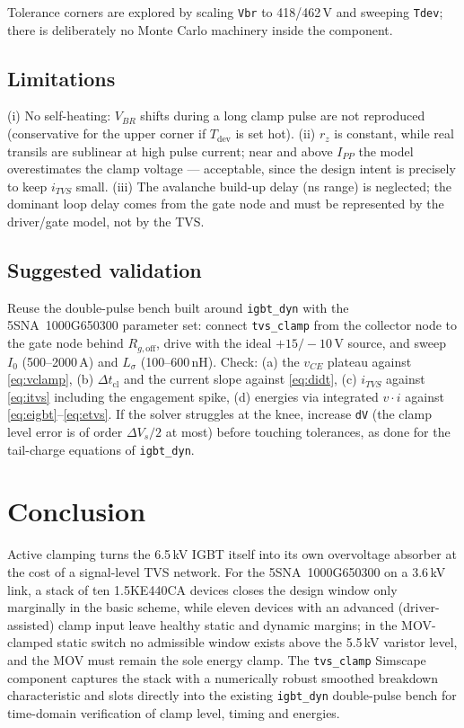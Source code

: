 \documentclass[11pt,a4paper]{article}
\begin{document}
Tolerance corners are explored by scaling \texttt{Vbr} to
418/462\,V and sweeping \texttt{Tdev}; there is deliberately no Monte
Carlo machinery inside the component.

\subsection{Limitations}

(i) No self-heating: $V_{BR}$ shifts during a long clamp pulse are not
reproduced (conservative for the upper corner if $T_{\mathrm{dev}}$ is
set hot). (ii) $r_z$ is constant, while real transils are sublinear at
high pulse current; near and above $I_{PP}$ the model overestimates the
clamp voltage --- acceptable, since the design intent is precisely to
keep $i_{TVS}$ small. (iii) The avalanche build-up delay (ns range) is
neglected; the dominant loop delay comes from the gate node and must be
represented by the driver/gate model, not by the TVS.

\subsection{Suggested validation}

Reuse the double-pulse bench built around \texttt{igbt\_dyn} with the
5SNA~1000G650300 parameter set: connect \texttt{tvs\_clamp} from the
collector node to the gate node behind $R_{g,\mathrm{off}}$, drive with
the ideal $+15/-10$\,V source, and sweep $I_0$ (500--2000\,A) and
$L_\sigma$ (100--600\,nH). Check: (a) the $v_{CE}$ plateau against
\eqref{eq:vclamp}, (b) $\Delta t_{\mathrm{cl}}$ and the current slope
against \eqref{eq:didt}, (c) $i_{TVS}$ against \eqref{eq:itvs}
including the engagement spike, (d) energies via integrated
$v\!\cdot\!i$ against \eqref{eq:eigbt}--\eqref{eq:etvs}. If the solver
struggles at the knee, increase \texttt{dV} (the clamp level error is
of order $\Delta V_s/2$ at most) before touching tolerances, as done
for the tail-charge equations of \texttt{igbt\_dyn}.

\section{Conclusion}

Active clamping turns the 6.5\,kV IGBT itself into its own overvoltage
absorber at the cost of a signal-level TVS network. For the
5SNA~1000G650300 on a 3.6\,kV link, a stack of ten 1.5KE440CA devices
closes the design window only marginally in the basic scheme, while
eleven devices with an advanced (driver-assisted) clamp input leave
healthy static and dynamic margins; in the MOV-clamped static switch no
admissible window exists above the 5.5\,kV varistor level, and the MOV
must remain the sole energy clamp. The \texttt{tvs\_clamp} Simscape
component captures the stack with a numerically robust smoothed
breakdown characteristic and slots directly into the existing
\texttt{igbt\_dyn} double-pulse bench for time-domain verification of
clamp level, timing and energies.
\end{document}
